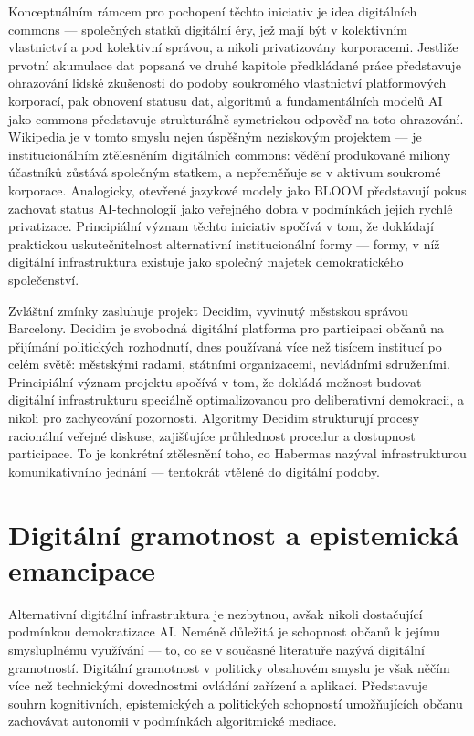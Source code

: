 Konceptuálním rámcem pro pochopení těchto iniciativ je idea digitálních commons — společných statků digitální éry, jež mají být v kolektivním vlastnictví a pod kolektivní správou, a nikoli privatizovány korporacemi.
Jestliže prvotní akumulace dat popsaná ve druhé kapitole předkládané práce představuje ohrazování lidské zkušenosti do podoby soukromého vlastnictví platformových korporací, pak obnovení statusu dat, algoritmů a fundamentálních modelů AI jako commons představuje strukturálně symetrickou odpověď na toto ohrazování.
Wikipedia je v tomto smyslu nejen úspěšným neziskovým projektem — je institucionálním ztělesněním digitálních commons:
vědění produkované miliony účastníků zůstává společným statkem, a nepřeměňuje se v aktivum soukromé korporace.
Analogicky, otevřené jazykové modely jako BLOOM představují pokus zachovat status AI-technologií jako veřejného dobra v podmínkách jejich rychlé privatizace. Principiální význam těchto iniciativ spočívá v tom, že dokládají praktickou uskutečnitelnost alternativní institucionální formy — formy, v níž digitální infrastruktura existuje jako společný majetek demokratického společenství.

Zvláštní zmínky zasluhuje projekt Decidim, vyvinutý městskou správou Barcelony.
Decidim je svobodná digitální platforma pro participaci občanů na přijímání politických rozhodnutí, dnes používaná více než tisícem institucí po celém světě: městskými radami, státními organizacemi, nevládními sdruženími.
Principiální význam projektu spočívá v tom, že dokládá možnost budovat digitální infrastrukturu speciálně optimalizovanou pro deliberativní demokracii, a nikoli pro zachycování pozornosti.
Algoritmy Decidim strukturují procesy racionální veřejné diskuse, zajišťujíce průhlednost procedur a dostupnost participace.
To je konkrétní ztělesnění toho, co Habermas nazýval infrastrukturou komunikativního jednání — tentokrát vtělené do digitální podoby.

\section{Digitální gramotnost a epistemická emancipace}

Alternativní digitální infrastruktura je nezbytnou, avšak nikoli dostačující podmínkou demokratizace AI.
Neméně důležitá je schopnost občanů k jejímu smysluplnému využívání — to, co se v současné literatuře nazývá digitální gramotností.
Digitální gramotnost v politicky obsahovém smyslu je však něčím více než technickými dovednostmi ovládání zařízení a aplikací.
Představuje souhrn kognitivních, epistemických a politických schopností umožňujících občanu zachovávat autonomii v podmínkách algoritmické mediace.

